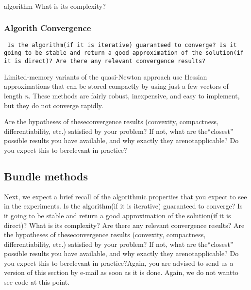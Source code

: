  algorithm What is its complexity?

\subsubsection{Algorith Convergence}
\texttt{ Is the algorithm(if it is iterative) guaranteed to converge? Is it going to be stable and return a good approximation of the solution(if it is direct)?  Are there any relevant convergence results?}

Limited-memory variants  of  the  quasi-Newton  approach use  Hessian  approximations  that  can  be stored compactly by using just a few vectors of length \textit{n}. These methods are fairly robust, inexpensive, and easy to implement, but they do not converge rapidly.

 
  Are the hypotheses of theseconvergence results (convexity, compactness, differentiability, etc.) satisfied by your problem? If not, what are the“closest” possible results you have available, and why exactly they arenotapplicable?  Do you expect this to berelevant in practice?

\subsection{Bundle methods}


Next, we expect a brief recall of the algorithmic properties that you expect to see in the experiments. Is the algorithm(if it is iterative) guaranteed to converge? Is it going to be stable and return a good approximation of the solution(if it is direct)? What is its complexity? Are there any relevant convergence results? Are the hypotheses of theseconvergence results (convexity, compactness, differentiability, etc.) satisfied by your problem? If not, what are the“closest” possible results you have available, and why exactly they arenotapplicable?  Do you expect this to berelevant in practice?Again, you are advised to send us a version of this section by e-mail as soon as it is done. Again, we do not wantto see code at this point.